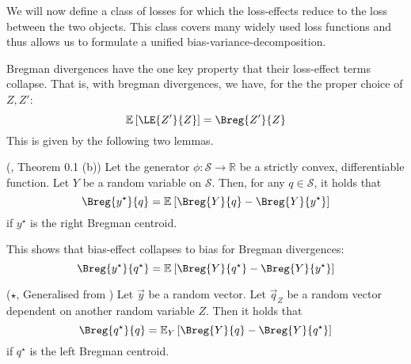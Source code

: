 \documentclass[../main.tex]{subfiles}
\begin{document}
We will now define a class of losses for which the loss-effects reduce to the loss between the two objects. This class covers many widely used loss functions and thus allows us to formulate a unified bias-variance-decomposition. 




Bregman divergences have the one key property that their loss-effect terms collapse. That is, with bregman divergences, we have, for the the proper choice of $Z, Z'$:
$$
\mathbb{E}\left[\LE{Z'}{Z}\right] = \Breg{Z'}{Z}
$$
This is given by the following two lemmas. 

\begin{lemma} \label{thm:bregman-collapse-bias} (\cite{pfau}, Theorem 0.1 (b))
Let the generator $\phi: \mathcal{S} \to \mathbb{R}$ be a strictly convex, differentiable function. Let $Y$ be a random variable on $\mathcal{S}$. Then, for any $q \in \mathcal{S}$, it holds that
$$
\Breg{y^\star}{q} = \mathbb{E}_{}\left[ \Breg{Y}{q}  - \Breg{Y}{y^\star} \right]
$$
if $y^\star$ is the right Bregman centroid.
\end{lemma}

This shows that bias-effect collapses to bias for Bregman divergences: 
$$\Breg{y^\star}{q^\star} = \mathbb{E}_{}\left[ \Breg{Y}{q^\star} - \Breg{Y}{y^\star} \right]$$

\begin{lemma} \label{thm:bregman-collapse-variances} ($\star$, Generalised from \cite{ref:wood23})
Let $\vec y$ be a random vector. Let $\vec q_{Z}$ be a random vector dependent on another random variable $Z$. Then it holds that
$$
\Breg{q^\star}{q} = 
\mathbb{E}_{Y}\left[ \Breg{Y}{q} - \Breg{Y}{q^\star} \right]  \\[1em]
$$
if  $q^\star$ is the left Bregman centroid.
\end{lemma}
\end{document}
